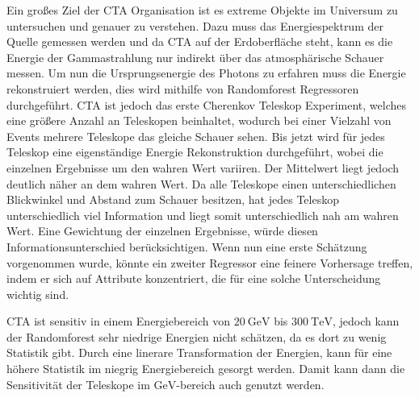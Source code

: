 Ein großes Ziel der CTA Organisation ist es extreme Objekte im Universum zu untersuchen und genauer zu verstehen.
Dazu muss das Energiespektrum der Quelle gemessen werden und da CTA auf der Erdoberfläche steht, kann es die Energie der Gammastrahlung nur indirekt über
das atmosphärische Schauer messen.
Um nun die Ursprungsenergie des Photons zu erfahren muss die Energie rekonstruiert werden, dies wird mithilfe von Randomforest Regressoren durchgeführt.
CTA ist jedoch das erste Cherenkov Teleskop Experiment, welches eine größere Anzahl an Teleskopen beinhaltet, wodurch bei einer Vielzahl von Events mehrere
Teleskope das gleiche Schauer sehen.
Bis jetzt wird für jedes Teleskop eine eigenständige Energie Rekonstruktion durchgeführt, wobei die einzelnen Ergebnisse um den wahren Wert variiren.
Der Mittelwert liegt jedoch deutlich näher an dem wahren Wert.
Da alle Teleskope einen unterschiedlichen Blickwinkel und Abstand zum Schauer besitzen, hat jedes Teleskop unterschiedlich viel Information und liegt somit
unterschiedlich nah am wahren Wert.
Eine Gewichtung der einzelnen Ergebnisse, würde diesen Informationsunterschied berücksichtigen.
Wenn nun eine erste Schätzung vorgenommen wurde, könnte ein zweiter Regressor eine feinere Vorhersage treffen, indem er sich auf Attribute konzentriert, die
für eine solche Unterscheidung wichtig sind.

CTA ist sensitiv in einem Energiebereich von $\SI{20}{\giga\eV}$ bis $\SI{300}{\tera\eV}$\cite{CTAscience}, jedoch kann der Randomforest
sehr niedrige Energien nicht schätzen, da es dort zu wenig Statistik gibt.
Durch eine linerare Transformation der Energien, kann für eine höhere Statistik im niegrig Energiebereich gesorgt werden.
Damit kann dann die Sensitivität der Teleskope im $\si{\giga\eV}$-bereich auch genutzt werden.
